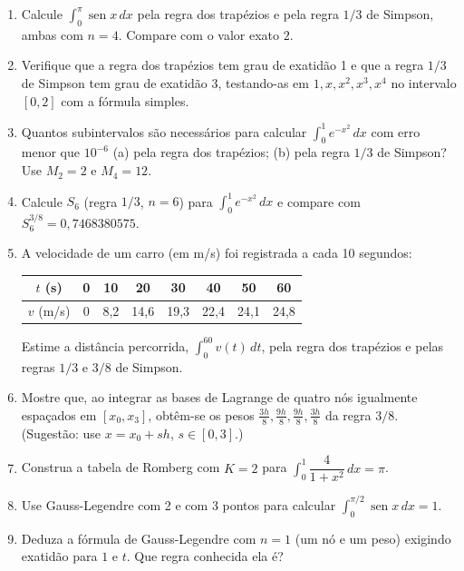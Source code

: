 \begin{enumerate}[label=\textbf{\arabic*.},leftmargin=*]
\item Calcule $\int_0^{\pi}\operatorname{sen}x\,dx$ pela regra dos trapézios e pela regra
  $1/3$ de Simpson, ambas com $n=4$. Compare com o valor exato $2$.

\item Verifique que a regra dos trapézios tem grau de exatidão 1 e que a regra $1/3$ de
  Simpson tem grau de exatidão 3, testando-as em $1,x,x^2,x^3,x^4$ no intervalo $[0,2]$ com
  a fórmula simples.

\item Quantos subintervalos são necessários para calcular $\int_0^1 e^{-x^2}\,dx$ com erro
  menor que $10^{-6}$ (a) pela regra dos trapézios; (b) pela regra $1/3$ de Simpson? Use
  $M_2=2$ e $M_4=12$.

\item\label{ex:simpson6} Calcule $S_6$ (regra $1/3$, $n=6$) para $\int_0^1 e^{-x^2}\,dx$ e
  compare com $S^{3/8}_6=0{,}7468380575$.

\item A velocidade de um carro (em m/s) foi registrada a cada 10 segundos:
  \begin{center}
  \begin{tabular}{c|ccccccc}
  $t$ (s) & 0 & 10 & 20 & 30 & 40 & 50 & 60\\ \hline
  $v$ (m/s) & 0 & 8{,}2 & 14{,}6 & 19{,}3 & 22{,}4 & 24{,}1 & 24{,}8
  \end{tabular}
  \end{center}
  Estime a distância percorrida, $\int_0^{60}v(t)\,dt$, pela regra dos trapézios e pelas
  regras $1/3$ e $3/8$ de Simpson.

\item Mostre que, ao integrar as bases de Lagrange de quatro nós igualmente espaçados em
  $[x_0,x_3]$, obtêm-se os pesos $\frac{3h}{8},\frac{9h}{8},\frac{9h}{8},\frac{3h}{8}$ da regra
  $3/8$. (Sugestão: use $x=x_0+sh$, $s\in[0,3]$.)

\item Construa a tabela de Romberg com $K=2$ para $\int_0^1\dfrac{4}{1+x^2}\,dx=\pi$.

\item Use Gauss-Legendre com 2 e com 3 pontos para calcular
  $\int_0^{\pi/2}\operatorname{sen}x\,dx=1$.

\item Deduza a fórmula de Gauss-Legendre com $n=1$ (um nó e um peso) exigindo exatidão para
  $1$ e $t$. Que regra conhecida ela é?


\end{enumerate}
